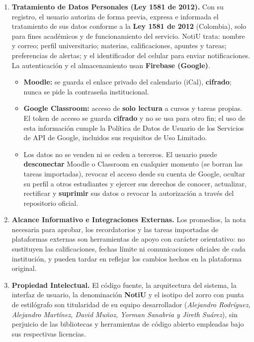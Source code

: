 \documentclass[10pt,letterpaper]{article}
\begin{document}
\begin{enumerate}[leftmargin=1.4em, itemsep=3.5pt, topsep=2pt, parsep=0pt, label=\textbf{\textcolor{notiuCrimson}{\arabic*.}}]
  \item \textbf{Tratamiento de Datos Personales (Ley 1581 de 2012).}
  Con su registro, el usuario autoriza de forma previa, expresa e informada el tratamiento de sus datos conforme a la \textbf{Ley 1581 de 2012} (Colombia), solo para fines académicos y de funcionamiento del servicio. NotiU trata: nombre y correo; perfil universitario; materias, calificaciones, apuntes y tareas; preferencias de alertas; y el identificador del celular para enviar notificaciones. La autenticación y el almacenamiento usan \textbf{Firebase (Google)}.
  \begin{itemize}[leftmargin=1.2em, itemsep=1pt, topsep=1pt, label=--]
    \item \textbf{Moodle:} se guarda el enlace privado del calendario (iCal), \textbf{cifrado}; nunca se pide la contraseña institucional.
    \item \textbf{Google Classroom:} acceso de \textbf{solo lectura} a cursos y tareas propias. El token de acceso se guarda \textbf{cifrado} y no se usa para otro fin; el uso de esta información cumple la Política de Datos de Usuario de los Servicios de API de Google, incluidos sus requisitos de Uso Limitado.
    \item Los datos no se venden ni se ceden a terceros. El usuario puede \textbf{desconectar} Moodle o Classroom en cualquier momento (se borran las tareas importadas), revocar el acceso desde su cuenta de Google, ocultar su perfil a otros estudiantes y ejercer sus derechos de conocer, actualizar, rectificar y \textbf{suprimir} sus datos o revocar la autorización a través del repositorio oficial.
  \end{itemize}

  \item \textbf{Alcance Informativo e Integraciones Externas.}
  Los promedios, la nota necesaria para aprobar, los recordatorios y las tareas importadas de plataformas externas son herramientas de apoyo con carácter orientativo: no sustituyen las calificaciones, fechas límite ni comunicaciones oficiales de cada institución, y pueden tardar en reflejar los cambios hechos en la plataforma original.

  \item \textbf{Propiedad Intelectual.}
  El código fuente, la arquitectura del sistema, la interfaz de usuario, la denominación \textbf{NotiU} y el isotipo del zorro con punta de estilógrafo son titularidad de su equipo desarrollador (\emph{Alejandro Rodríguez, Alejandro Martínez, David Muñoz, Yorman Sanabria y Jireth Suárez}), sin perjuicio de las bibliotecas y herramientas de código abierto empleadas bajo sus respectivas licencias.


\end{enumerate}
\end{document}

